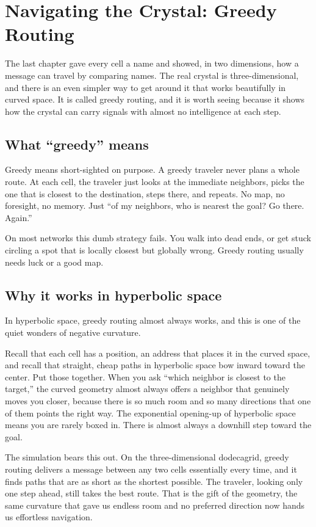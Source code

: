 \section{Navigating the Crystal: Greedy Routing}

The last chapter gave every cell a name and showed, in two dimensions, how a message can travel by comparing names. The real crystal is three-dimensional, and there is an even simpler way to get around it that works beautifully in curved space. It is called greedy routing, and it is worth seeing because it shows how the crystal can carry signals with almost no intelligence at each step.

\subsection{What ``greedy'' means}

Greedy means short-sighted on purpose. A greedy traveler never plans a whole route. At each cell, the traveler just looks at the immediate neighbors, picks the one that is closest to the destination, steps there, and repeats. No map, no foresight, no memory. Just ``of my neighbors, who is nearest the goal? Go there. Again.''

On most networks this dumb strategy fails. You walk into dead ends, or get stuck circling a spot that is locally closest but globally wrong. Greedy routing usually needs luck or a good map.

\subsection{Why it works in hyperbolic space}

In hyperbolic space, greedy routing almost always works, and this is one of the quiet wonders of negative curvature.

Recall that each cell has a position, an address that places it in the curved space, and recall that straight, cheap paths in hyperbolic space bow inward toward the center. Put those together. When you ask ``which neighbor is closest to the target,'' the curved geometry almost always offers a neighbor that genuinely moves you closer, because there is so much room and so many directions that one of them points the right way. The exponential opening-up of hyperbolic space means you are rarely boxed in. There is almost always a downhill step toward the goal.

The simulation bears this out. On the three-dimensional dodecagrid, greedy routing delivers a message between any two cells essentially every time, and it finds paths that are as short as the shortest possible. The traveler, looking only one step ahead, still takes the best route. That is the gift of the geometry, the same curvature that gave us endless room and no preferred direction now hands us effortless navigation.

